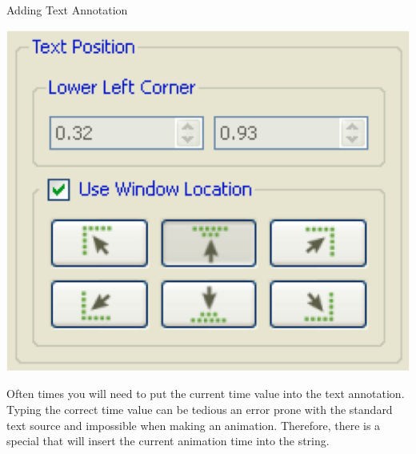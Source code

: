 \begin{exercise}{Adding Text Annotation}
  \begin{inlinefig}
    \includegraphics[width=.66\scw]{images/TextPosition}
  \end{inlinefig}
\end{exercise}

Often times you will need to put the current time value into the text
annotation.  Typing the correct time value can be tedious an error prone
with the standard text source and impossible when making an animation.
Therefore, there is a special  that will
insert the current animation time into the string.

